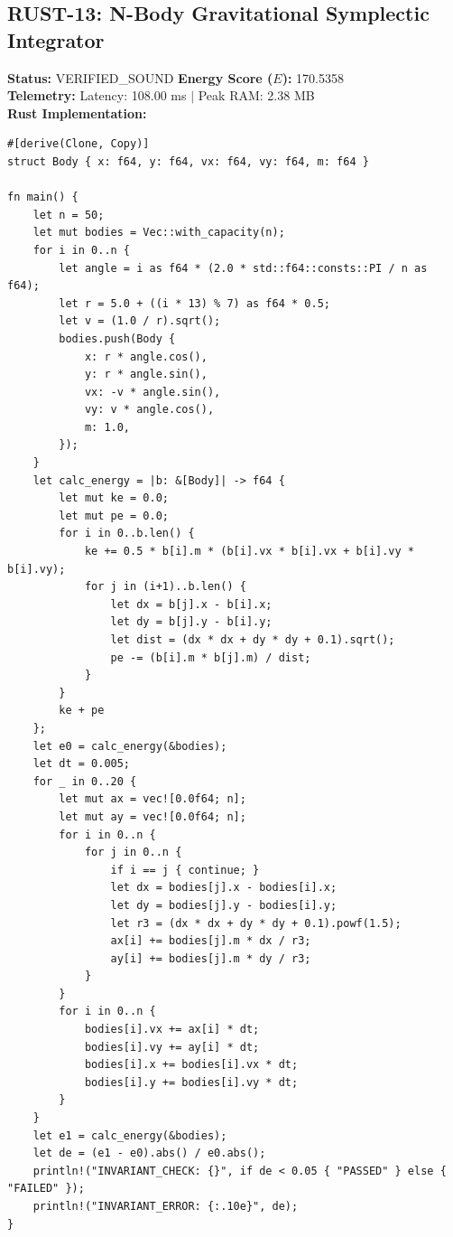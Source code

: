 \documentclass[11pt, a4paper]{article}
\begin{document}
\subsection{RUST-13: N-Body Gravitational Symplectic Integrator}
\textbf{Status:} VERIFIED\_SOUND \hfill \textbf{Energy Score ($E$):} 170.5358\\
\textbf{Telemetry:} Latency: 108.00 ms $|$ Peak RAM: 2.38 MB\\
\textbf{Rust Implementation:}
\begin{verbatim}
#[derive(Clone, Copy)]
struct Body { x: f64, y: f64, vx: f64, vy: f64, m: f64 }

fn main() {
    let n = 50;
    let mut bodies = Vec::with_capacity(n);
    for i in 0..n {
        let angle = i as f64 * (2.0 * std::f64::consts::PI / n as f64);
        let r = 5.0 + ((i * 13) % 7) as f64 * 0.5;
        let v = (1.0 / r).sqrt();
        bodies.push(Body {
            x: r * angle.cos(),
            y: r * angle.sin(),
            vx: -v * angle.sin(),
            vy: v * angle.cos(),
            m: 1.0,
        });
    }
    let calc_energy = |b: &[Body]| -> f64 {
        let mut ke = 0.0;
        let mut pe = 0.0;
        for i in 0..b.len() {
            ke += 0.5 * b[i].m * (b[i].vx * b[i].vx + b[i].vy * b[i].vy);
            for j in (i+1)..b.len() {
                let dx = b[j].x - b[i].x;
                let dy = b[j].y - b[i].y;
                let dist = (dx * dx + dy * dy + 0.1).sqrt();
                pe -= (b[i].m * b[j].m) / dist;
            }
        }
        ke + pe
    };
    let e0 = calc_energy(&bodies);
    let dt = 0.005;
    for _ in 0..20 {
        let mut ax = vec![0.0f64; n];
        let mut ay = vec![0.0f64; n];
        for i in 0..n {
            for j in 0..n {
                if i == j { continue; }
                let dx = bodies[j].x - bodies[i].x;
                let dy = bodies[j].y - bodies[i].y;
                let r3 = (dx * dx + dy * dy + 0.1).powf(1.5);
                ax[i] += bodies[j].m * dx / r3;
                ay[i] += bodies[j].m * dy / r3;
            }
        }
        for i in 0..n {
            bodies[i].vx += ax[i] * dt;
            bodies[i].vy += ay[i] * dt;
            bodies[i].x += bodies[i].vx * dt;
            bodies[i].y += bodies[i].vy * dt;
        }
    }
    let e1 = calc_energy(&bodies);
    let de = (e1 - e0).abs() / e0.abs();
    println!("INVARIANT_CHECK: {}", if de < 0.05 { "PASSED" } else { "FAILED" });
    println!("INVARIANT_ERROR: {:.10e}", de);
}
\end{verbatim}
\end{document}
